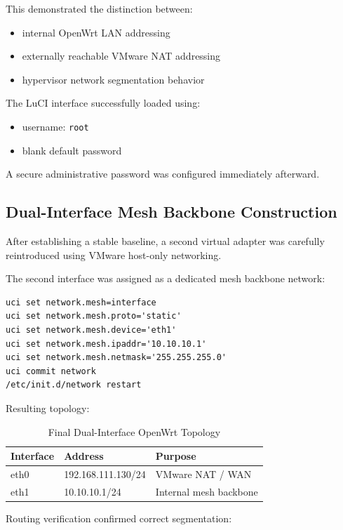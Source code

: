 \documentclass[conference]{IEEEtran}
\begin{document}
This demonstrated the distinction between:
\begin{itemize}
    \item internal OpenWrt LAN addressing
    \item externally reachable VMware NAT addressing
    \item hypervisor network segmentation behavior
\end{itemize}

The LuCI interface successfully loaded using:
\begin{itemize}
    \item username: \texttt{root}
    \item blank default password
\end{itemize}

A secure administrative password was configured immediately afterward.

\subsection{Dual-Interface Mesh Backbone Construction}

After establishing a stable baseline, a second virtual adapter was carefully reintroduced using VMware host-only networking.

The second interface was assigned as a dedicated mesh backbone network:

\begin{verbatim}
uci set network.mesh=interface
uci set network.mesh.proto='static'
uci set network.mesh.device='eth1'
uci set network.mesh.ipaddr='10.10.10.1'
uci set network.mesh.netmask='255.255.255.0'
uci commit network
/etc/init.d/network restart
\end{verbatim}

Resulting topology:

\begin{table}[h]
\centering
\caption{Final Dual-Interface OpenWrt Topology}
\label{tab:dualinterface}
\begin{tabular}{|l|l|l|}
\hline
Interface & Address & Purpose \\ \hline
eth0 & 192.168.111.130/24 & VMware NAT / WAN \\ \hline
eth1 & 10.10.10.1/24 & Internal mesh backbone \\ \hline
\end{tabular}
\end{table}

Routing verification confirmed correct segmentation:
\end{document}
